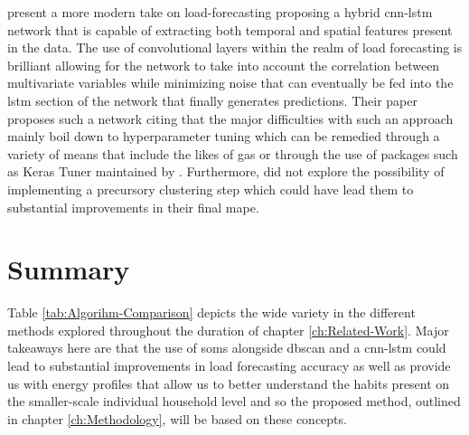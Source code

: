 \noindent \newline \citet{Kim} present a more modern take on load-forecasting proposing a hybrid \gls{cnn-lstm} network that is capable of extracting both temporal and spatial features present in the data. The use of convolutional layers within the realm of load forecasting is brilliant allowing for the network to take into account the correlation between multivariate variables while minimizing noise that can eventually be fed into the \gls{lstm} section of the network that finally generates predictions. Their paper proposes such a network citing that the major difficulties with such an approach mainly boil down to hyperparameter tuning which can be remedied through a variety of means that include the likes of \glspl{ga} or through the use of packages such as Keras Tuner maintained by \citet{KerasTuner}. Furthermore, \citet{Kim} did not explore the possibility of implementing a precursory clustering step which could have lead them to substantial improvements in their final \gls{mape}.

\section{Summary}
\label{sec:Related-Work:Summary}
Table \ref{tab:Algorihm-Comparison} depicts the wide variety in the different methods explored throughout the duration of chapter \ref{ch:Related-Work}. Major takeaways here are that the use of \glspl{som} alongside \gls{dbscan} and a \gls{cnn-lstm} could lead to substantial improvements in load forecasting accuracy as well as provide us with energy profiles that allow us to better understand the habits present on the smaller-scale individual household level and so the proposed method, outlined in chapter \ref{ch:Methodology}, will be based on these concepts.

